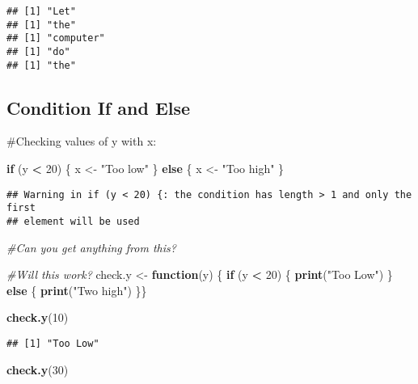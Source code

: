 \documentclass[
]{article}
\newenvironment{Shaded}{\begin{snugshade}}{\end{snugshade}}
\newcommand{\CommentTok}[1]{\textcolor[rgb]{0.56,0.35,0.01}{\textit{#1}}}
\newcommand{\ControlFlowTok}[1]{\textcolor[rgb]{0.13,0.29,0.53}{\textbf{#1}}}
\newcommand{\DecValTok}[1]{\textcolor[rgb]{0.00,0.00,0.81}{#1}}
\newcommand{\FunctionTok}[1]{\textcolor[rgb]{0.13,0.29,0.53}{\textbf{#1}}}
\newcommand{\NormalTok}[1]{#1}
\newcommand{\OtherTok}[1]{\textcolor[rgb]{0.56,0.35,0.01}{#1}}
\newcommand{\SpecialCharTok}[1]{\textcolor[rgb]{0.81,0.36,0.00}{\textbf{#1}}}
\newcommand{\StringTok}[1]{\textcolor[rgb]{0.31,0.60,0.02}{#1}}
\begin{document}
\begin{verbatim}
## [1] "Let"
## [1] "the"
## [1] "computer"
## [1] "do"
## [1] "the"
\end{verbatim}

\subsection{Condition If and Else}\label{condition-if-and-else}

\#Checking values of y with x:

\begin{Shaded}
\begin{Highlighting}[]
\ControlFlowTok{if}\NormalTok{ (y }\SpecialCharTok{\textless{}} \DecValTok{20}\NormalTok{) \{}
\NormalTok{x }\OtherTok{\textless{}{-}} \StringTok{"Too low"}
\NormalTok{\} }\ControlFlowTok{else}\NormalTok{ \{}
\NormalTok{x }\OtherTok{\textless{}{-}} \StringTok{"Too high"}
\NormalTok{\}}
\end{Highlighting}
\end{Shaded}

\begin{verbatim}
## Warning in if (y < 20) {: the condition has length > 1 and only the first
## element will be used
\end{verbatim}

\begin{Shaded}
\begin{Highlighting}[]
\CommentTok{\#Can you get anything from this?}

\CommentTok{\#Will this work?}
\NormalTok{check.y }\OtherTok{\textless{}{-}} \ControlFlowTok{function}\NormalTok{(y) \{}
\ControlFlowTok{if}\NormalTok{ (y }\SpecialCharTok{\textless{}} \DecValTok{20}\NormalTok{) \{}
\FunctionTok{print}\NormalTok{(}\StringTok{"Too Low"}\NormalTok{) \} }\ControlFlowTok{else}\NormalTok{ \{}
\FunctionTok{print}\NormalTok{(}\StringTok{"Two high"}\NormalTok{)}
\NormalTok{\}\}}

\FunctionTok{check.y}\NormalTok{(}\DecValTok{10}\NormalTok{)}
\end{Highlighting}
\end{Shaded}

\begin{verbatim}
## [1] "Too Low"
\end{verbatim}

\begin{Shaded}
\begin{Highlighting}[]
\FunctionTok{check.y}\NormalTok{(}\DecValTok{30}\NormalTok{)}
\end{Highlighting}
\end{Shaded}
\end{document}
